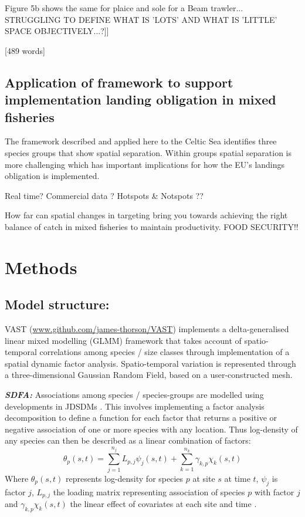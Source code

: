 \documentclass{nature}
\begin{document}
\begin{linenumbers}
Figure 5b shows the same for plaice and sole for a Beam trawler...
STRUGGLING TO DEFINE WHAT IS 'LOTS' AND WHAT IS 'LITTLE' SPACE
OBJECTIVELY...?]]

[489 words]

\subsection{Application of framework to support implementation landing
	obligation in mixed fisheries}
The framework described and applied here to the Celtic Sea identifies three
species groups that show spatial separation. Within groups spatial separation
is more challenging which has important implications for how the EU's landings
obligation is implemented.


Real time?  Commercial data ?  Hotspots \& Notspots ??

How far can spatial changes in targeting bring you towards achieving the right
balance of catch in mixed fisheries to maintain productivity. FOOD SECURITY!!

\section*{Methods}

\subsection{Model structure:} 

VAST (\url{www.github.com/james-thorson/VAST}) implements a delta-generalised
linear mixed modelling (GLMM) framework that takes account of spatio-temporal
correlations among species / size classes through implementation of a spatial
dynamic factor analysis.  Spatio-temporal variation is represented through a
three-dimensional Gaussian Random Field, based on a user-constructed mesh. 

\textbf{\textit{SDFA:}} Associations among species / species-groups are
modelled using developments in JDSDMs \cite{Thorson2017}. This involves
implementing a factor analysis decomposition to define a function for each
factor that returns a positive or negative association of one or more species
with any location. Thus log-density of any species can then be described as a
linear combination of factors:
	\begin{equation}
		\theta_{p}(s,t) = \sum_{j=1}^{n_{j}}
		L_{p,j}\psi_{j}(s,t) +\sum_{k=1}^{n_{k}}
		\gamma_{k,p}\chi_{k}(s,t)
	\end{equation}
Where $\theta_{p}(s,t)$ represents log-density for species $p$ at site $s$ at
time $t$, $\psi_{j}$ is factor $j$, $L_{p,j}$ the loading matrix representing
association of species $p$ with factor $j$ and $\gamma_{k,p}\chi_{k}(s,t)$ the
linear effect of covariates at each site and time \cite{Thorson2016b}. 


\end{linenumbers}
\end{document}
